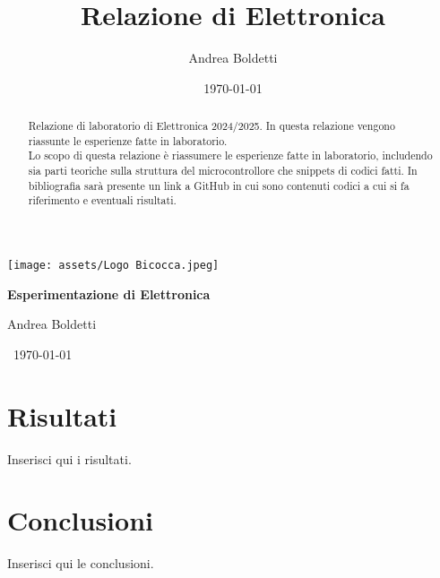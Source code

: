 \documentclass[a4paper]{article}
\title{Relazione di Elettronica}
\author{Andrea Boldetti}
\date{\today}
\begin{document}
\texttt{[image: assets/Logo Bicocca.jpeg]}

\begin{center}
        {\fontsize{23pt}{23pt}\selectfont\bfseries{}\selectfont Esperimentazione di Elettronica \par}
        \vspace{1cm} %
        {\fontsize{17pt}{22pt}\selectfont{}\selectfont Andrea Boldetti \par}

        \vspace{1cm}
        {\centering\fontsize{20pt}{20pt}\selectfont{}\selectfont \ \today \par}
\end{center}
 \vspace{5cm}

\begin{abstract}
Relazione di laboratorio di Elettronica 2024/2025. In questa relazione vengono riassunte le esperienze fatte in laboratorio.\\
Lo scopo di questa relazione è riassumere le esperienze fatte in laboratorio, includendo sia parti teoriche sulla struttura del microcontrollore che snippets di codici fatti. In bibliografia sarà presente un link a GitHub in cui sono contenuti codici a cui si fa riferimento e eventuali risultati.\\




\end{abstract}

\newpage
{
    \hypersetup{linkcolor=black}
    \tableofcontents
}
\newpage





\section{Risultati}
Inserisci qui i risultati.

\section{Conclusioni}
Inserisci qui le conclusioni.
\end{document}
